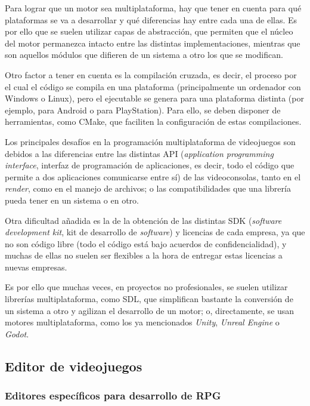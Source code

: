 \medskip

Para lograr que un motor sea multiplataforma, hay que tener en cuenta para qué plataformas se va a desarrollar y qué diferencias hay entre cada una de ellas. Es por ello que se suelen utilizar capas de abstracción, que permiten que el núcleo del motor permanezca intacto entre las distintas implementaciones, mientras que son aquellos módulos que difieren de un sistema a otro los que se modifican.

\smallskip

Otro factor a tener en cuenta es la compilación cruzada, es decir, el proceso por el cual el código se compila en una plataforma (principalmente un ordenador con Windows o Linux), pero el ejecutable se genera para una plataforma distinta (por ejemplo, para Android o para PlayStation). Para ello, se deben disponer de herramientas, como CMake, que faciliten la configuración de estas compilaciones.

\medskip

Los principales desafíos en la programación multiplataforma de videojuegos son debidos a las diferencias entre las distintas API (\textit{application programming interface}, interfaz de programación de aplicaciones, es decir, todo el código que permite a dos aplicaciones comunicarse entre sí) de las videoconsolas, tanto en el \textit{render}, como en el manejo de archivos; o las compatibilidades que una librería pueda tener en un sistema o en otro.

\medskip

Otra dificultad añadida es la de la obtención de las distintas SDK (\textit{software development kit}, kit de desarrollo de \textit{software}) y licencias de cada empresa, ya que no son código libre (todo el código está bajo acuerdos de confidencialidad), y muchas de ellas no suelen ser flexibles a la hora de entregar estas licencias a nuevas empresas.

\medskip

Es por ello que muchas veces, en proyectos no profesionales, se suelen utilizar librerías multiplataforma, como SDL, que simplifican bastante la conversión de un sistema a otro y agilizan el desarrollo de un motor; o, directamente, se usan motores multiplataforma, como los ya mencionados \textit{Unity}, \textit{Unreal Engine} o \textit{Godot}.

\subsection{Editor de videojuegos}

\subsubsection{Editores específicos para desarrollo de RPG}

